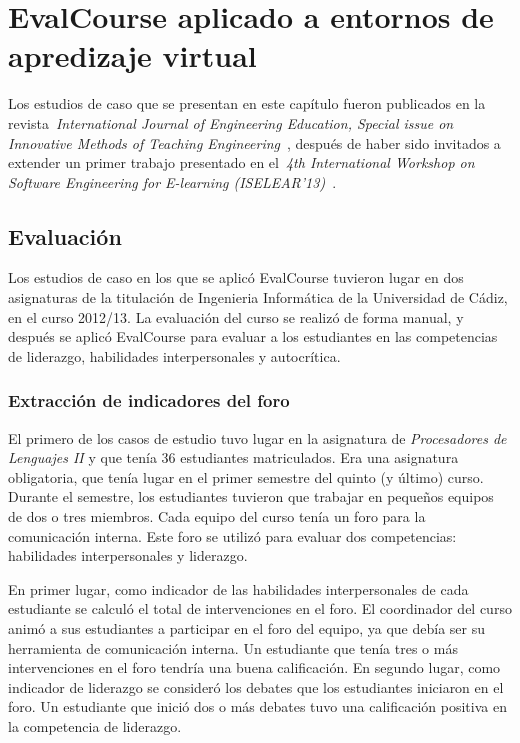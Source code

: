 \section{EvalCourse aplicado a entornos de apredizaje virtual}

Los estudios de caso que se presentan en este capítulo fueron publicados en la revista~\emph{International Journal of Engineering Education, Special issue on Innovative Methods of Teaching Engineering}~\cite{Balderas:2015}, después de haber sido invitados a extender un primer trabajo presentado en el~\emph{4th International Workshop on Software Engineering for E-learning (ISELEAR’13)}~\cite{balderas2013generative}.

\subsection{Evaluación}

Los estudios de caso en los que se aplicó EvalCourse tuvieron lugar en dos asignaturas de la titulación de Ingenieria Informática de la Universidad de Cádiz, en el curso 2012/13. La evaluación del curso se realizó de forma manual, y después se aplicó EvalCourse para evaluar a los estudiantes en las competencias de liderazgo, habilidades interpersonales y autocrítica.

\subsubsection{Extracción de indicadores del foro}

El primero de los casos de estudio tuvo lugar en la asignatura de \emph{Procesadores de Lenguajes II} y que tenía 36 estudiantes matriculados. Era una asignatura obligatoria, que tenía lugar en el primer semestre del quinto (y último) curso. Durante el semestre, los estudiantes tuvieron que trabajar en pequeños equipos de dos o tres miembros. Cada equipo del curso tenía un foro para la comunicación interna. Este foro se utilizó para evaluar dos competencias: habilidades interpersonales y liderazgo.

En primer lugar, como indicador de las habilidades interpersonales de cada estudiante se calculó el total de intervenciones en el foro. El coordinador del curso animó a sus estudiantes a participar en el foro del equipo, ya que debía ser su herramienta de comunicación interna. Un estudiante que tenía tres o más intervenciones en el foro tendría una buena calificación. En segundo lugar, como indicador de liderazgo se consideró los debates que los estudiantes iniciaron en el foro. Un estudiante que inició dos o más debates tuvo una calificación positiva en la competencia de liderazgo.

